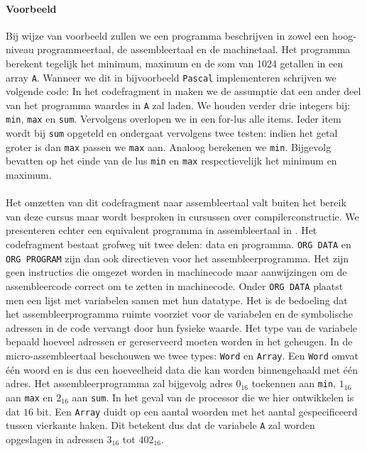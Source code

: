 \paragraph{Voorbeeld}
Bij wijze van voorbeeld zullen we een programma beschrijven in zowel een hoog-niveau programmeertaal, de assembleertaal en de machinetaal. Het programma berekent tegelijk het minimum, maximum en de som van 1024 getallen in een array \verb+A+. Wanneer we dit in bijvoorbeeld \verb+Pascal+ implementeren schrijven we volgende code:
In het codefragment in  maken we de assumptie dat een ander deel van het programma waardes in \verb+A+ zal laden. We houden verder drie integers bij: \verb+min+, \verb+max+ en \verb+sum+. Vervolgens overlopen we in een for-lus alle items. Ieder item wordt bij \verb+sum+ opgeteld en ondergaat vervolgens twee testen: indien het getal groter is dan \verb+max+ passen we \verb+max+ aan. Analoog berekenen we \verb+min+. Bijgevolg bevatten op het einde van de lus \verb+min+ en \verb+max+ respectievelijk het minimum en maximum.
\paragraph{}
Het omzetten van dit codefragment naar assembleertaal valt buiten het bereik van deze cursus maar wordt besproken in cursussen over compilerconstructie. We presenteren echter een equivalent programma in assembleertaal in .
Het codefragment bestaat grofweg uit twee delen: data en programma. \verb+ORG DATA+ en \verb+ORG PROGRAM+ zijn dan ook directieven voor het assembleerprogramma. Het zijn geen instructies die omgezet worden in machinecode maar aanwijzingen om de assembleercode correct om te zetten in machinecode. Onder \verb+ORG DATA+ plaatst men een lijst met variabelen samen met hun datatype. Het is de bedoeling dat het assembleerprogramma ruimte voorziet voor de variabelen en de symbolische adressen in de code vervangt door hun fysieke waarde. Het type van de variabele bepaald hoeveel adressen er gereserveerd moeten worden in het geheugen. In de micro-assembleertaal beschouwen we twee types: \verb+Word+ en \verb+Array+. Een \verb+Word+ omvat \'e\'en woord en is dus een hoeveelheid data die kan worden binnengehaald met \'e\'en adres. Het assembleerprogramma zal bijgevolg adres $0_{16}$ toekennen aan \verb+min+, $1_{16}$ aan \verb+max+ en $2_{16}$ aan \verb+sum+. In het geval van de processor die we hier ontwikkelen is dat $16$ bit. Een \verb+Array+ duidt op een aantal woorden met het aantal gespecificeerd tussen vierkante haken. Dit betekent dus dat de variabele \verb+A+ zal worden opgeslagen in adressen $3_{16}$ tot $402_{16}$.
